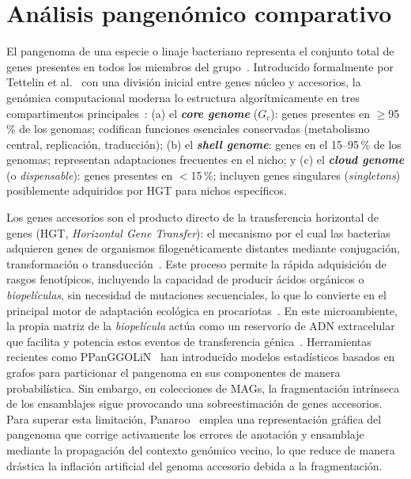 \section{Análisis pangenómico comparativo}
\label{sec:pangenomics}

El pangenoma de una especie o linaje bacteriano representa el
conjunto total de genes presentes en todos los miembros del
grupo~\cite{tettelin2005}. Introducido formalmente por Tettelin et
al.~\cite{tettelin2005} con una división inicial entre genes núcleo y accesorios, 
la genómica computacional moderna lo estructura algorítmicamente en tres 
compartimentos principales~\cite{Page2015, panaroo2020}:
(a) el \textbf{\textit{core genome}} ($G_c$): genes presentes en
$\geq$95\,\% de los genomas; codifican funciones esenciales
conservadas (metabolismo central, replicación, traducción);
(b) el \textbf{\textit{shell genome}}: genes en el 15--95\,\% de los
genomas; representan adaptaciones frecuentes en el nicho; y
(c) el \textbf{\textit{cloud genome}} (o \textit{dispensable}): genes
presentes en $<$15\,\%; incluyen genes singulares (\textit{singletons})
posiblemente adquiridos por HGT para nichos específicos.

Los genes accesorios son el producto directo de la
transferencia horizontal de genes (HGT, \textit{Horizontal
Gene Transfer}): el mecanismo por el cual las bacterias adquieren
genes de organismos filogenéticamente distantes mediante conjugación,
transformación o transducción~\cite{soucy2015}. Este proceso permite la
rápida adquisición de rasgos fenotípicos, incluyendo la capacidad de
producir ácidos orgánicos o \textit{biopelículas}, sin necesidad de
mutaciones secuenciales, lo que lo convierte en el principal motor de
adaptación ecológica en procariotas~\cite{soucy2015}. En este microambiente, 
la propia matriz de la \textit{biopelícula} actúa como un reservorio de ADN 
extracelular que facilita y potencia estos eventos de transferencia 
génica~\cite{flemming2010}. Herramientas recientes como PPanGGOLiN~\cite{ppanggolin2020} han introducido modelos estadísticos basados en grafos para particionar 
el pangenoma en sus componentes de manera probabilística. Sin embargo, 
en colecciones de MAGs, la fragmentación intrínseca de los ensamblajes 
sigue provocando una sobreestimación de genes accesorios. Para superar 
esta limitación, Panaroo~\cite{panaroo2020} emplea una representación 
gráfica del pangenoma que corrige activamente los errores de anotación 
y ensamblaje mediante la propagación del contexto genómico vecino, 
lo que reduce de manera drástica la inflación artificial del genoma 
accesorio debida a la fragmentación.

